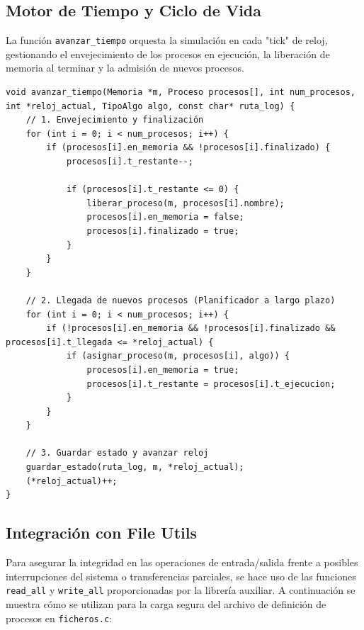 \documentclass[11pt,a4paper]{article}
\begin{document}
\subsection{Motor de Tiempo y Ciclo de Vida}

La función \texttt{avanzar\_tiempo} orquesta la simulación en cada "tick" de reloj, gestionando el envejecimiento de los procesos en ejecución, la liberación de memoria al terminar y la admisión de nuevos procesos.

\begin{lstlisting}[caption={Lógica principal de avance temporal}, label={lst:avanzar}]
void avanzar_tiempo(Memoria *m, Proceso procesos[], int num_procesos, int *reloj_actual, TipoAlgo algo, const char* ruta_log) {
    // 1. Envejecimiento y finalización
    for (int i = 0; i < num_procesos; i++) {
        if (procesos[i].en_memoria && !procesos[i].finalizado) {
            procesos[i].t_restante--;

            if (procesos[i].t_restante <= 0) {
                liberar_proceso(m, procesos[i].nombre);
                procesos[i].en_memoria = false;
                procesos[i].finalizado = true;
            }
        }
    }

    // 2. Llegada de nuevos procesos (Planificador a largo plazo)
    for (int i = 0; i < num_procesos; i++) {
        if (!procesos[i].en_memoria && !procesos[i].finalizado && procesos[i].t_llegada <= *reloj_actual) {
            if (asignar_proceso(m, procesos[i], algo)) {
                procesos[i].en_memoria = true;
                procesos[i].t_restante = procesos[i].t_ejecucion;
            }
        }
    }

    // 3. Guardar estado y avanzar reloj
    guardar_estado(ruta_log, m, *reloj_actual);
    (*reloj_actual)++;
}
\end{lstlisting}

\subsection{Integración con File Utils}

Para asegurar la integridad en las operaciones de entrada/salida frente a posibles interrupciones del sistema o transferencias parciales, se hace uso de las funciones \texttt{read\_all} y \texttt{write\_all} proporcionadas por la librería auxiliar. A continuación se muestra cómo se utilizan para la carga segura del archivo de definición de procesos en \texttt{ficheros.c}:
\end{document}
